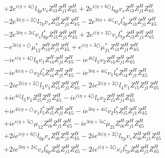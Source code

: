 \begin{align}
 &+2 e^{i \Big(\eta +4 \zeta \Big)} l_{3p} v_s Z_{{i 3}}^{H} Z_{{j 1}}^{H} Z_{{k 5}}^{H} +2 e^{i \Big(\eta +6 \zeta \Big)} l_{6p} v_s Z_{{i 3}}^{H} Z_{{j 1}}^{H} Z_{{k 5}}^{H} \nonumber \\ 
 &-2 e^{3 i \Big(\eta +2 \zeta \Big)} l_{7p} v_s Z_{{i 3}}^{H} Z_{{j 1}}^{H} Z_{{k 5}}^{H} -2 e^{3 i \eta +4 i \zeta } v_s l_{3p}^* Z_{{i 3}}^{H} Z_{{j 1}}^{H} Z_{{k 5}}^{H} \nonumber \\ 
 &-2 e^{3 i \eta +2 i \zeta } v_s l_{6p}^* Z_{{i 3}}^{H} Z_{{j 1}}^{H} Z_{{k 5}}^{H} +2 e^{i \Big(\eta +2 \zeta \Big)} v_s l_{7p}^* Z_{{i 3}}^{H} Z_{{j 1}}^{H} Z_{{k 5}}^{H} \nonumber \\ 
 &- e^{3 i \Big(\eta +\zeta \Big)} \mu_{12}^* Z_{{i 3}}^{H} Z_{{j 1}}^{H} Z_{{k 5}}^{H} +e^{i \Big(\eta +3 \zeta \Big)} \mu_{21}^* Z_{{i 3}}^{H} Z_{{j 1}}^{H} Z_{{k 5}}^{H} \nonumber \\ 
 &-i e^{i \Big(\eta +4 \zeta \Big)} l_6 v_1 Z_{{i 4}}^{H} Z_{{j 1}}^{H} Z_{{k 5}}^{H} -i e^{4 i \zeta } l_5 v_2 Z_{{i 4}}^{H} Z_{{j 1}}^{H} Z_{{k 5}}^{H} \nonumber \\ 
 &-i e^{4 i \Big(\eta +\zeta \Big)} v_2 l_5^* Z_{{i 4}}^{H} Z_{{j 1}}^{H} Z_{{k 5}}^{H} -i e^{3 i \eta +4 i \zeta } v_1 l_6^* Z_{{i 4}}^{H} Z_{{j 1}}^{H} Z_{{k 5}}^{H} \nonumber \\ 
 &-2 i e^{2 i \Big(\eta +2 \zeta \Big)} l_3 v_1 Z_{{i 5}}^{H} Z_{{j 1}}^{H} Z_{{k 5}}^{H} -2 i e^{2 i \Big(\eta +2 \zeta \Big)} l_4 v_1 Z_{{i 5}}^{H} Z_{{j 1}}^{H} Z_{{k 5}}^{H} \nonumber \\ 
 &+i e^{4 i \zeta } l_5 v_1 Z_{{i 5}}^{H} Z_{{j 1}}^{H} Z_{{k 5}}^{H} -i e^{i \Big(\eta +4 \zeta \Big)} l_7 v_2 Z_{{i 5}}^{H} Z_{{j 1}}^{H} Z_{{k 5}}^{H} \nonumber \\ 
 &+i e^{4 i \Big(\eta +\zeta \Big)} v_1 l_5^* Z_{{i 5}}^{H} Z_{{j 1}}^{H} Z_{{k 5}}^{H} -i e^{3 i \eta +4 i \zeta } v_2 l_7^* Z_{{i 5}}^{H} Z_{{j 1}}^{H} Z_{{k 5}}^{H} \nonumber \\ 
 &+i e^{i \Big(\eta +5 \zeta \Big)} \mu_{12} Z_{{i 6}}^{H} Z_{{j 1}}^{H} Z_{{k 5}}^{H} -i e^{3 i \eta +5 i \zeta } \mu_{21} Z_{{i 6}}^{H} Z_{{j 1}}^{H} Z_{{k 5}}^{H} \nonumber \\ 
 &+2 i e^{i \Big(\eta +6 \zeta \Big)} l_{6p} v_s Z_{{i 6}}^{H} Z_{{j 1}}^{H} Z_{{k 5}}^{H} -2 i e^{3 i \Big(\eta +2 \zeta \Big)} l_{7p} v_s Z_{{i 6}}^{H} Z_{{j 1}}^{H} Z_{{k 5}}^{H} \nonumber \\ 
 &+2 i e^{3 i \eta +2 i \zeta } v_s l_{6p}^* Z_{{i 6}}^{H} Z_{{j 1}}^{H} Z_{{k 5}}^{H} -2 i e^{i \Big(\eta +2 \zeta \Big)} v_s l_{7p}^* Z_{{i 6}}^{H} Z_{{j 1}}^{H} Z_{{k 5}}^{H} \nonumber \\ 

\end{align}
